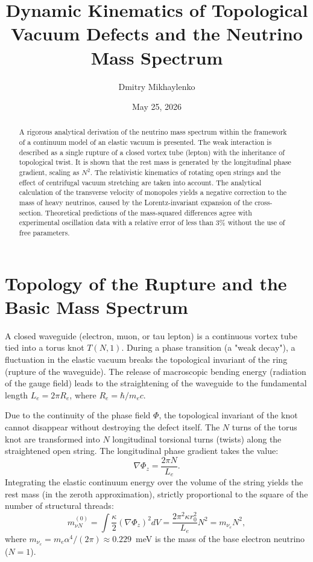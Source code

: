 \documentclass[12pt,a4paper]{article}
\title{Dynamic Kinematics of Topological Vacuum Defects and the Neutrino Mass Spectrum}
\author{Dmitry Mikhaylenko}
\date{May 25, 2026}
\begin{document}
	
	\maketitle
	
	\begin{abstract}
		A rigorous analytical derivation of the neutrino mass spectrum within the framework of a continuum model of an elastic vacuum is presented. The weak interaction is described as a single rupture of a closed vortex tube (lepton) with the inheritance of topological twist. It is shown that the rest mass is generated by the longitudinal phase gradient, scaling as $N^2$. The relativistic kinematics of rotating open strings and the effect of centrifugal vacuum stretching are taken into account. The analytical calculation of the transverse velocity of monopoles yields a negative correction to the mass of heavy neutrinos, caused by the Lorentz-invariant expansion of the cross-section. Theoretical predictions of the mass-squared differences agree with experimental oscillation data with a relative error of less than 3\% without the use of free parameters.
	\end{abstract}
	
	\section{Topology of the Rupture and the Basic Mass Spectrum}
	
	A closed waveguide (electron, muon, or tau lepton) is a continuous vortex tube tied into a torus knot $T(N, 1)$. During a phase transition (a "weak decay"), a fluctuation in the elastic vacuum breaks the topological invariant of the ring (rupture of the waveguide). The release of macroscopic bending energy (radiation of the gauge field) leads to the straightening of the waveguide to the fundamental length $L_e = 2\pi R_e$, where $R_e = \hbar / m_e c$.
	
	Due to the continuity of the phase field $\Phi$, the topological invariant of the knot cannot disappear without destroying the defect itself. The $N$ turns of the torus knot are transformed into $N$ longitudinal torsional turns (twists) along the straightened open string. The longitudinal phase gradient takes the value:
	\begin{equation}
		\nabla \Phi_z = \frac{2\pi N}{L_e}.
	\end{equation}
	Integrating the elastic continuum energy over the volume of the string yields the rest mass (in the zeroth approximation), strictly proportional to the square of the number of structural threads:
	\begin{equation}
		m_{\nu N}^{(0)} = \int \frac{\kappa}{2} (\nabla \Phi_z)^2 dV = \frac{2\pi^2 \kappa r_0^2}{L_e} N^2 = m_{\nu_e} N^2,
	\end{equation}
	where $m_{\nu_e} = m_e \alpha^4 / (2\pi) \approx 0.229$~meV is the mass of the base electron neutrino ($N=1$).
	
\end{document}
